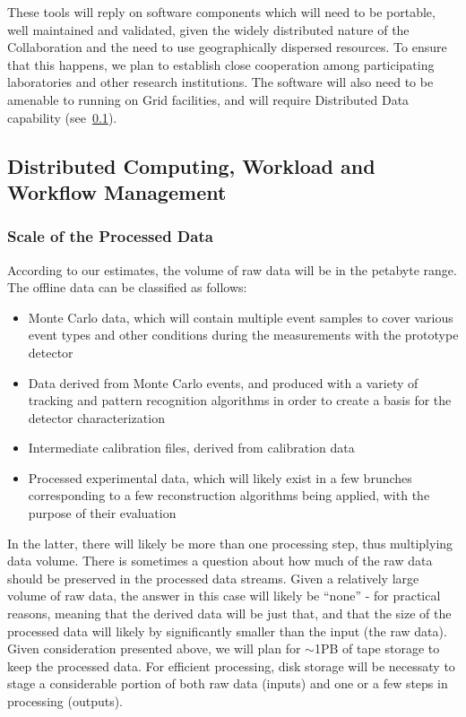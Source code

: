 These tools will reply on software components which will need to be portable, well maintained and validated, given
the widely distributed nature of the Collaboration and the need to use geographically dispersed resources. To ensure that this happens,
we plan to establish close cooperation among participating laboratories and other research institutions. The software will also need
to be amenable to running on Grid facilities, and will require Distributed Data capability (see~\ref{wms}).

\subsection{Distributed Computing, Workload and Workflow Management}
\label{wms}
\subsubsection{Scale of the Processed Data}
According to our estimates, the volume of raw data will be in the petabyte range. The offline data can be classified as follows:
\begin{itemize}
\item Monte Carlo data, which will contain multiple event samples to cover various event types and other conditions during the measurements with the prototype detector
\item Data derived from Monte Carlo events, and produced with a variety of tracking and pattern recognition algorithms in order to create a basis for the detector characterization
\item Intermediate calibration files, derived from calibration data
\item Processed experimental data, which will likely exist in a few brunches corresponding to a few reconstruction algorithms being applied, with the purpose of their evaluation
\end{itemize}

In the latter, there will likely be more than one processing step, thus multiplying data volume. There is sometimes a question about how much of the raw data should be preserved in
the processed data streams. Given a relatively large volume of raw data, the answer in this case will likely be ``none'' - for practical reasons, meaning that the derived data will
be just that, and that the size of the processed data will likely by significantly smaller than the input (the raw data). Given consideration presented above, we will plan for
$\sim$1PB of tape storage to keep the processed data. For efficient processing, disk storage will be necessaty to stage a considerable portion of both raw data (inputs) and
one or a few steps in processing (outputs).

